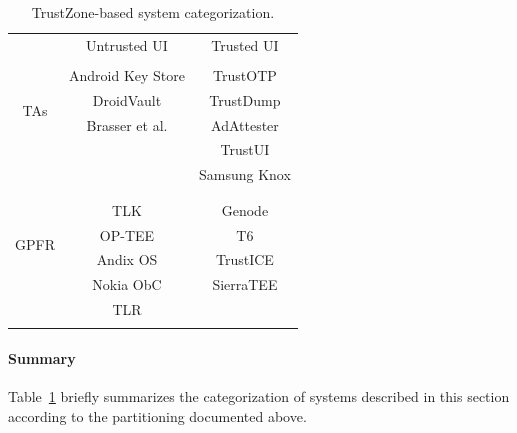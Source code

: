 \begin{table}[t!]
	\centering
	\caption{TrustZone-based system categorization.}
	\label{tab:trustzonesystemscomparison}
	\begin{tabular}{ c|c|c| }
		\multicolumn{1}{c}{} 	& \multicolumn{1}{c}{Untrusted UI} 	& \multicolumn{1}{c}{Trusted UI} \\ \cline{2-3}
		\multirow{5}{*}{TAs} 	&									& \\
								& Android Key Store					& TrustOTP \\
								& DroidVault 						& TrustDump \\
								& Brasser et al.					& AdAttester \\
								& 									& TrustUI \\
								&									& Samsung Knox\\
								&									& \\
								\cline{2-3}
		\multirow{5}{*}{GPFR}	&									& \\
								& TLK								& Genode \\
								& OP-TEE 							& T6 \\
								& Andix OS							& TrustICE \\
								& Nokia ObC							& SierraTEE \\
								& TLR 								& \\
								&									& \\
		\cline{2-3}
	\end{tabular}
\end{table}

\paragraph{Summary} Table~\ref{tab:trustzonesystemscomparison} briefly summarizes the categorization of systems described in this section according to the partitioning documented above. %

